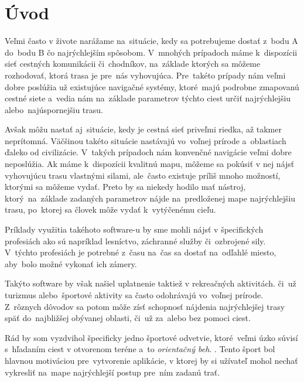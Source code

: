 \chapter*{Úvod}

Veľmi často v živote narážame na~situácie, kedy sa potrebujeme dostať z~bodu A do~bodu B čo najrýchlejším spôsobom. V~mnohých prípadoch máme k~dispozícii sieť cestných komunikácii či~chodníkov, na~základe ktorých sa môžeme rozhodovať, ktorá trasa je pre~nás vyhovujúca. Pre~takéto prípady nám veľmi dobre poslúžia už existujúce navigačné systémy, ktoré~majú podrobne zmapovanú cestné siete a~vedia nám na~základe parametrov týchto ciest určiť najrýchlejšiu alebo~najúspornejšiu trasu.

Avšak môžu nastať aj~situácie, kedy je cestná sieť priveľmi riedka, až takmer neprítomná. Väčšinou takéto situácie nastávajú vo~voľnej prírode a~oblastiach ďaleko od civilizácie. V~takých prípadoch nám konvenčné navigácie veľmi dobre neposlúžia. Ak máme k~dispozícii kvalitnú mapu, môžeme sa pokúsiť v nej nájsť vyhovujúcu trasu vlastnými silami, ale~často existuje príliš mnoho možností, ktorými sa môžeme vydať. Preto by sa niekedy hodilo mať nástroj, ktorý~na~základe zadaných parametrov nájde na~predloženej mape najrýchlejšiu trasu, po~ktorej sa človek môže vydať k~vytýčenému cieľu.

Príklady využitia takéhoto software-u by sme mohli nájsť v špecifických profesiách ako sú napríklad lesníctvo, záchranné služby či~ozbrojené sily. V~týchto profesiách je potrebné z~času na~čas sa dostať na~odľahlé miesto, aby~bolo možné vykonať ich zámery.

Takýto software by však našiel uplatnenie taktiež v rekreačných aktivitách. či~už turizmus alebo~športové aktivity sa často odohrávajú vo~voľnej prírode. Z~rôznych dôvodov sa potom môže zísť schopnosť nájdenia najrýchlejšej trasy späť do~najbližšej obývanej oblasti, či~už za~alebo bez pomoci ciest. 

Rád by som vyzdvihol špecificky jedno športové odvetvie, ktoré~veľmi úzko súvisí s~hľadaním ciest v otvorenom teréne a~to \textit{orientačný beh}. \cite{CoJeOrientak}. Tento šport bol hlavnou motiváciou pre~vytvorenie aplikácie, v ktorej by si užívateľ mohol nechať vykresliť na~mape najrýchlejší postup pre~ním zadanú trať. 

